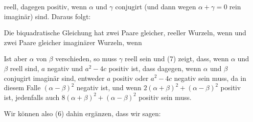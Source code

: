 reell, dagegen positiv, wenn $\alpha$ und $\gamma$ conjugirt (und dann wegen $\alpha+\gamma=0$ rein imaginär) sind. Daraus folgt:

%
Die biquadratische Gleichung hat zwei Paare gleicher, reeller Wurzeln, wenn
und zwei Paare gleicher imaginärer Wurzeln, wenn

Ist aber $\alpha$ von $\beta$ verschieden, so muss $\gamma$ reell sein und (7) zeigt, dass, wenn $\alpha$ und $\beta$ reell sind, $a$ negativ und $a^2-4c$ positiv ist, dass dagegen, wenn $\alpha$ und $\beta$ conjugirt imaginär sind, entweder $a$ positiv oder $a^2-4c$ negativ sein muss, da in diesem Falle $(\alpha-\beta)^2$ negativ ist, und wenn $2(\alpha+\beta)^2+(\alpha-\beta)^2$ positiv ist, jedenfalls auch $8(\alpha+\beta)^2+(\alpha-\beta)^2$ positiv sein muss.

Wir können also (6) dahin ergänzen, dass wir sagen:


